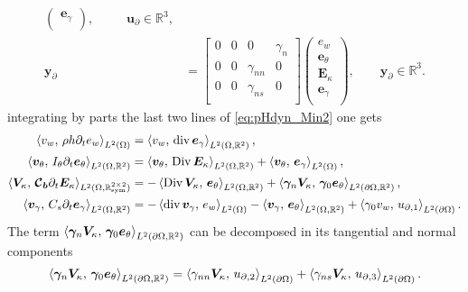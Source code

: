\begin{subequations}
\begin{align}
\begin{pmatrix}
	\bm{e}_{\gamma} \\
	\end{pmatrix}, \qquad\;\; \bm{u}_\partial \in \mathbb{R}^3, \\
	\bm{y}_\partial &= 
	\begin{bmatrix}
	{0} &  {0} & {0} & \gamma_{n} \\
	{0} &  {0} & \gamma_{nn} & {0} \\
	{0} &  {0} & \gamma_{ns} & {0} \\
	\end{bmatrix}
	\begin{pmatrix}
	e_w \\
	\bm{e}_{\theta} \\
	\bm{E}_{\kappa} \\
	\bm{e}_{\gamma} \\
	\end{pmatrix}, \qquad \bm{y}_\partial \in \mathbb{R}^3.
	\end{align}
\end{subequations}
integrating by parts the last two lines of \eqref{eq:pHdyn_Min2} one gets 
\begin{equation}
\begin{aligned}
\inner[L^2(\Omega)]{v_w}{\rho h \partial_t e_w} &= \inner[L^2(\Omega, \mathbb{R}^{2})]{v_w}{\div \bm{e}_\gamma}, \\
\inner[L^2(\Omega, \mathbb{R}^{2})]{\bm{v}_\theta}{I_\theta \partial_t \bm{e}_\theta} &= \inner[L^2(\Omega, \mathbb{R}^{2})]{\bm{v}_\theta}{\Div \bm{E}_\kappa} + \inner[L^2(\Omega)]{\bm{v}_\theta}{\bm{e}_\gamma} , \\
\inner[L^2(\Omega, \mathbb{R}^{2\times 2}_{\text{sym}})]{\bm{V}_\kappa}{\bm{\mathcal{C}_b} \partial_t \bm{E}_\kappa} &= -\inner[L^2(\Omega, \mathbb{R}^{2})]{\Div \bm{V}_\kappa}{\bm{e}_\theta} + \inner[L^2(\partial\Omega, \mathbb{R}^2)]{\bm\gamma_n \bm{V}_\kappa}{\bm\gamma_0 \bm{e}_{\theta}}, \\
\inner[L^2(\Omega, \mathbb{R}^{2})]{\bm{v}_\gamma}{C_s \partial_t \bm{e}_\gamma} &= -\inner[L^2(\Omega)]{\div \bm{v}_\gamma}{e_w} - \inner[L^2(\Omega, \mathbb{R}^{2})]{\bm{v}_\gamma}{\bm{e}_\theta}  + \inner[L^2(\partial\Omega)]{\gamma_0 v_w}{{u}_{\partial, 1}}. \\
\end{aligned}
\end{equation}
The term $\inner[L^2(\partial\Omega, \mathbb{R}^2)]{\bm\gamma_n \bm{V}_\kappa}{\bm\gamma_0 \bm{e}_{\theta}}$ can be decomposed in its tangential and normal components
\begin{equation}
\inner[L^2(\partial\Omega, \mathbb{R}^2)]{\bm\gamma_n \bm{V}_\kappa}{\bm\gamma_0 \bm{e}_{\theta}} = \inner[L^2(\partial\Omega)]{\gamma_{nn} \bm{V}_\kappa}{{u}_{\partial,2}} + \inner[L^2(\partial\Omega)]{\gamma_{ns} \bm{V}_\kappa}{{u}_{\partial,3}}.
\end{equation}
